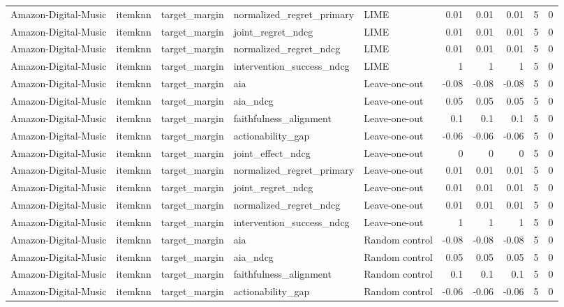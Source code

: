\begin{table}[t]
{\begin{tabular}{lllllrrrrr}
Amazon-Digital-Music & itemknn & target\_margin & normalized\_regret\_primary & LIME & 0.01 & 0.01 & 0.01 & 5 & 0 \\
Amazon-Digital-Music & itemknn & target\_margin & joint\_regret\_ndcg & LIME & 0.01 & 0.01 & 0.01 & 5 & 0 \\
Amazon-Digital-Music & itemknn & target\_margin & normalized\_regret\_ndcg & LIME & 0.01 & 0.01 & 0.01 & 5 & 0 \\
Amazon-Digital-Music & itemknn & target\_margin & intervention\_success\_ndcg & LIME & 1 & 1 & 1 & 5 & 0 \\
Amazon-Digital-Music & itemknn & target\_margin & aia & Leave-one-out & -0.08 & -0.08 & -0.08 & 5 & 0 \\
Amazon-Digital-Music & itemknn & target\_margin & aia\_ndcg & Leave-one-out & 0.05 & 0.05 & 0.05 & 5 & 0 \\
Amazon-Digital-Music & itemknn & target\_margin & faithfulness\_alignment & Leave-one-out & 0.1 & 0.1 & 0.1 & 5 & 0 \\
Amazon-Digital-Music & itemknn & target\_margin & actionability\_gap & Leave-one-out & -0.06 & -0.06 & -0.06 & 5 & 0 \\
Amazon-Digital-Music & itemknn & target\_margin & joint\_effect\_ndcg & Leave-one-out & 0 & 0 & 0 & 5 & 0 \\
Amazon-Digital-Music & itemknn & target\_margin & normalized\_regret\_primary & Leave-one-out & 0.01 & 0.01 & 0.01 & 5 & 0 \\
Amazon-Digital-Music & itemknn & target\_margin & joint\_regret\_ndcg & Leave-one-out & 0.01 & 0.01 & 0.01 & 5 & 0 \\
Amazon-Digital-Music & itemknn & target\_margin & normalized\_regret\_ndcg & Leave-one-out & 0.01 & 0.01 & 0.01 & 5 & 0 \\
Amazon-Digital-Music & itemknn & target\_margin & intervention\_success\_ndcg & Leave-one-out & 1 & 1 & 1 & 5 & 0 \\
Amazon-Digital-Music & itemknn & target\_margin & aia & Random control & -0.08 & -0.08 & -0.08 & 5 & 0 \\
Amazon-Digital-Music & itemknn & target\_margin & aia\_ndcg & Random control & 0.05 & 0.05 & 0.05 & 5 & 0 \\
Amazon-Digital-Music & itemknn & target\_margin & faithfulness\_alignment & Random control & 0.1 & 0.1 & 0.1 & 5 & 0 \\
Amazon-Digital-Music & itemknn & target\_margin & actionability\_gap & Random control & -0.06 & -0.06 & -0.06 & 5 & 0 \\

\end{tabular}}
\end{table}
